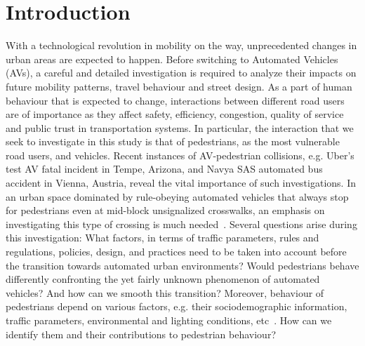 \section{Introduction}
\label{S:intro}
With a technological revolution in mobility on the way, unprecedented changes in urban areas are expected to happen. Before switching to Automated Vehicles (AVs), a careful and detailed investigation is required to analyze their impacts on future mobility patterns, travel behaviour and street design. As a part of human behaviour that is expected to change, interactions between different road users are of importance as they affect safety, efficiency, congestion, quality of service and public trust in transportation systems. In particular, the interaction that we seek to investigate in this study is that of pedestrians, as the most vulnerable road users, and vehicles. Recent instances of AV-pedestrian collisions, e.g. Uber's test AV fatal incident in Tempe, Arizona, and Navya SAS automated bus accident in Vienna, Austria, reveal the vital importance of such investigations. In an urban space dominated by rule-obeying automated vehicles that always stop for pedestrians even at mid-block unsignalized crosswalks, an emphasis on investigating this type of crossing is much needed~\citep{millard2018pedestrians}.
Several questions arise during this investigation: What factors, in terms of traffic parameters, rules and regulations, policies, design, and practices need to be taken into account before the transition towards automated urban environments? Would pedestrians behave differently confronting the yet fairly unknown phenomenon of automated vehicles? And how can we smooth this transition? Moreover, behaviour of pedestrians depend on various factors, e.g. their sociodemographic information, traffic parameters, environmental and lighting conditions, etc~\citep{rasouli2019autonomous}. How can we identify them and their contributions to pedestrian behaviour?

